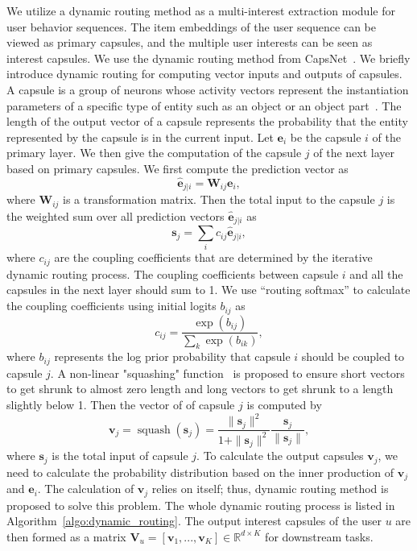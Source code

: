 We utilize a dynamic routing method as a multi-interest extraction module for user behavior sequences. The item embeddings of the user sequence can be viewed as primary capsules, and the multiple user interests can be seen as interest capsules. We use the dynamic routing method from CapsNet~\cite{sabour2017dynamic}. 
We briefly introduce dynamic routing for computing vector inputs and outputs of capsules. A capsule is a group of neurons whose activity vectors represent the instantiation parameters of a specific type of entity such as an object or an object part~\cite{sabour2017dynamic}. The length of the output vector of a capsule represents the probability that the entity represented by the capsule is in the current input. Let $\mathbf{e}_i$ be the capsule $i$ of the primary layer. We then give the computation of the capsule $j$ of the next layer based on primary capsules. 
We first compute the prediction vector as
\begin{equation}
    \hat{\mathbf{e}}_{j|i}=\mathbf{W}_{ij} \mathbf{e}_{i},
\end{equation}
where $\mathbf{W}_{ij}$ is a transformation matrix. Then the total input to the capsule $j$ is the weighted sum over all prediction vectors $\hat{\mathbf{e}}_{j|i}$ as
\begin{equation}
        \mathbf{s}_j = \sum_i c_{ij} \hat{\mathbf{e}}_{j|i},
\end{equation}
where $c_{ij}$ are the coupling coefficients that are determined by the iterative dynamic routing process. The coupling coefficients between capsule $i$ and all the capsules in the next layer should sum to 1. We use ``routing softmax'' to calculate the coupling coefficients using initial logits $b_{ij}$ as
\begin{equation}
    c_{ij}=\frac{\exp(b_{ij})}{\sum_k \exp(b_{ik})},
\end{equation}
where $b_{ij}$ represents the log prior probability that capsule $i$ should be coupled to capsule $j$. A non-linear "squashing" function~\cite{sabour2017dynamic} is proposed to ensure short vectors to get shrunk to almost zero length and long vectors to get shrunk to a length slightly below 1. Then the vector of of capsule $j$ is computed by
\begin{equation}
    \label{eqn:squash}
    \mathbf{v}_j = \operatorname{squash}(\mathbf{s}_j) =  \frac{\|\mathbf{s}_j\|^2}{1+\|\mathbf{s}_j\|^2} \frac{\mathbf{s}_j}{\|\mathbf{s}_j\|},
\end{equation}
where $\mathbf{s}_j$ is the total input of capsule $j$. To calculate the output capsules $\mathbf{v}_j$, we need to calculate the probability distribution based on the inner production of $\mathbf{v}_j$ and $\mathbf{e}_i$. The calculation of $\mathbf{v}_j$ relies on itself; thus, dynamic routing method is proposed to solve this problem. The whole dynamic routing process is listed in Algorithm~\ref{algo:dynamic_routing}. The output interest capsules of the user $u$ are then formed as a matrix $\mathbf{V}_u=[\mathbf{v}_1, ..., \mathbf{v}_K] \in \mathbb{R}^{d\times K}$ for downstream tasks.

